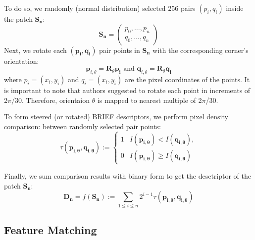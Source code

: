 \documentclass[a4paper]{report}
\numberwithin{figure}{section}
\begin{document}
\begin{enumerate}
    To do so, we randomly (normal distribution) 
    selected 256 pairs $(p_i,q_i)$ 
    inside the patch $\mathbf{S_n}$:
    \begin{equation}
      \mathbf{S_n} = 
      \begin{pmatrix}
      p_0, \dots, p_n\\
      q_0, \dots, q_n
      \end{pmatrix}
    \end{equation}
    Next, we rotate each $(\mathbf{p_i, q_i})$ pair points in 
    $\mathbf{S_n}$ with the 
    corresponding corner's orientation:
    \begin{equation}
      \mathbf{p}_{i,\theta} = \mathbf{R}_{\theta}\mathbf{p_i} \text{ and } 
      \mathbf{q}_{i,\theta} = \mathbf{R}_{\theta}\mathbf{q_i}
    \end{equation}
    where $p_i=(x_i, y_i)$ and $q_i=(x_i, y_i)$ are the pixel coordinates of 
    the points.
    It is important to note that authors \cite{} suggested to rotate each point in 
    increments of 2$\pi$/30. Therefore, orientaion $\theta$ is mapped to 
    nearest multiple of 2$\pi$/30.

    To form steered (or rotated) BRIEF descriptors, we perform pixel density comparison:
    between randomly selected pair points:
    \begin{equation*}
      \tau(\mathbf{p_{i,\theta}},\mathbf{q_{i,\theta}}) := 
      \begin{cases}
        1  & I(\mathbf{p_{i,\theta}}) < I(\mathbf{q_{i,\theta}}),\\
        0  & I(\mathbf{p_{i,\theta}}) \geq I(\mathbf{q_{i,\theta}})
      \end{cases}
    \end{equation*}

    Finally, we sum comparison results with binary form to get the desctriptor 
    of the patch $\mathbf{S_n}$:
    \begin{equation}
      \mathbf{D_n} = f(\mathbf{S_n}) := \sum_{1\leq i \leq n} 2^{i-1}\tau (\mathbf{p_{i,\theta}, q_{i,\theta}})
    \end{equation}

\end{enumerate}





\subsection{Feature Matching} \label{sc_feature_matching}
\end{document}
